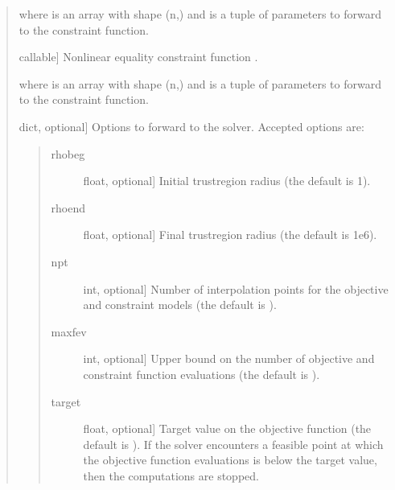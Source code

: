 \documentclass[letterpaper,10pt,english]{sphinxmanual}
\begin{document}
\begin{fulllineitems}
\begin{quote}
\begin{description}
\begin{description}
\sphinxAtStartPar
where  is an array with shape (n,) and  is a tuple of
parameters to forward to the constraint function.

\item[{\sphinxstylestrong{ceq}}] \leavevmode{[}callable{]}
\sphinxAtStartPar
Nonlinear equality constraint function .
\begin{quote}

\sphinxAtStartPar
{}
\end{quote}

\sphinxAtStartPar
where  is an array with shape (n,) and  is a tuple of
parameters to forward to the constraint function.

\item[{\sphinxstylestrong{options}}] \leavevmode{[}dict, optional{]}
\sphinxAtStartPar
Options to forward to the solver. Accepted options are:
\begin{quote}
\begin{description}
\item[{rhobeg}] \leavevmode{[}float, optional{]}
\sphinxAtStartPar
Initial trust\sphinxhyphen{}region radius (the default is 1).

\item[{rhoend}] \leavevmode{[}float, optional{]}
\sphinxAtStartPar
Final trust\sphinxhyphen{}region radius (the default is 1e\sphinxhyphen{}6).

\item[{npt}] \leavevmode{[}int, optional{]}
\sphinxAtStartPar
Number of interpolation points for the objective and constraint
models (the default is ).

\item[{maxfev}] \leavevmode{[}int, optional{]}
\sphinxAtStartPar
Upper bound on the number of objective and constraint function
evaluations (the default is ).

\item[{target}] \leavevmode{[}float, optional{]}
\sphinxAtStartPar
Target value on the objective function (the default is
). If the solver encounters a feasible point at
which the objective function evaluations is below the target
value, then the computations are stopped.


\end{description}
\end{quote}
\end{description}
\end{description}
\end{quote}
\end{fulllineitems}
\end{document}
